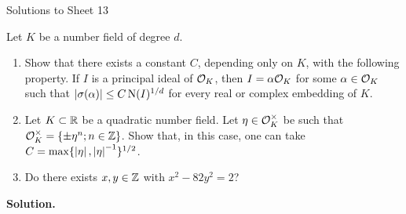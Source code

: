 \documentclass[a4paper,11pt]{article}
\begin{document}
\begin{center}
    \huge{Solutions to Sheet 13}
\end{center}

Let $K$ be a number field of degree $d$.
\begin{enumerate}
    \item Show that there exists a constant $C$, depending only on $K$,
        with the following property. If $I$ is a principal ideal of $\mathcal{O}_K$,
        then $I = \alpha \mathcal{O}_K$ for some $\alpha \in \mathcal{O}_K$ such that 
        $\left\lvert \sigma(\alpha) \right\rvert \leq C \operatorname{N}(I)^{1/d}$ for every real or 
        complex embedding of $K$.
    \item Let $K \subset \mathbb{R}$ be a quadratic number field. Let $\eta \in \mathcal{O}_K^\times$
        be such that $\mathcal{O}_K^\times = \{\pm \eta^n ; n \in \mathbb{Z}\}$. Show that, in this
        case, one can take $C = \max\{\left\lvert \eta \right\rvert, \left\lvert \eta \right\rvert^{-1}\}^{1/2}$.
    \item Do there exists $x,y \in \mathbb{Z}$ with $x^2 - 82y^2 = 2$?
\end{enumerate}
\textbf{Solution.}
\end{document}

